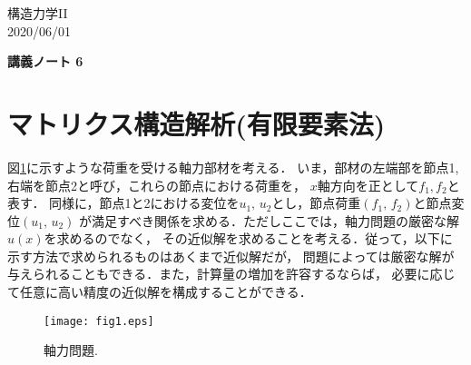 \documentclass[10pt,a4j]{jarticle}
\newlength{\minitwocolumn}
\begin{document}
\newcommand{\fat}[1]{\mbox{\boldmath $#1$}}
\newcommand{\D}{\partial}
\newcommand{\w}{\omega}
\newcommand{\ga}{\alpha}
\newcommand{\gb}{\beta}
\newcommand{\gx}{\xi}
\newcommand{\gz}{\zeta}
\newcommand{\vhat}[1]{\hat{\fat{#1}}}
\newcommand{\spc}{\vspace{0.7\baselineskip}}
\newcommand{\halfspc}{\vspace{0.3\baselineskip}}

\newcommand{\twofig}[2]
 {
   \begin{figure}
     \begin{minipage}[t]{\minitwocolumn}
         \begin{center}   #1
         \end{center}
     \end{minipage}
         \hspace{\columnsep}
     \begin{minipage}[t]{\minitwocolumn}
         \begin{center} #2
         \end{center}
     \end{minipage}
   \end{figure}
 }
\begin{flushright}
	構造力学II\\
	2020/06/01
\end{flushright}
\begin{center}
	{\LARGE \bf 講義ノート 6} \\
\end{center}
\section{マトリクス構造解析(有限要素法)}
図\ref{fig:fig1}に示すような荷重を受ける軸力部材を考える．
いま，部材の左端部を節点1, 右端を節点2と呼び，これらの節点における荷重を，
$x$軸方向を正として$f_1,f_2$と表す．
同様に，節点1と2における変位を$u_1,\,u_2$とし，節点荷重$(f_1,\, f_2)$と節点変位$(u_1,\, u_2)$
が満足すべき関係を求める．ただしここでは，軸力問題の厳密な解$u(x)$を求めるのでなく，
その近似解を求めることを考える．従って，以下に示す方法で求められるものはあくまで近似解だが，
問題によっては厳密な解が与えられることもできる．また，計算量の増加を許容するならば，
必要に応じて任意に高い精度の近似解を構成することができる．
\begin{figure}[b]
	\begin{center}
	\texttt{[image: fig1.eps]} 
	\end{center}
	\caption{軸力問題.} 
	\label{fig:fig1}
\end{figure}
\end{document}
